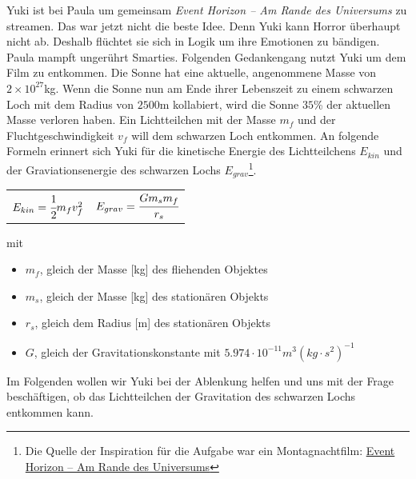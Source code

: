 \documentclass[a4paper, 9pt]{scrartcl}\usepackage[]{graphicx}\usepackage[]{xcolor}
\begin{document}
Yuki ist bei Paula um gemeinsam \textit{Event Horizon -- Am Rande des Universums} zu streamen. Das war jetzt nicht die beste Idee. Denn Yuki kann Horror überhaupt nicht ab. Deshalb flüchtet sie sich in Logik um ihre Emotionen zu bändigen. Paula mampft ungerührt Smarties. Folgenden Gedankengang nutzt Yuki um dem Film zu entkommen. Die Sonne hat eine aktuelle, angenommene Masse von $\ensuremath{2\times 10^{27}}$kg. Wenn die Sonne nun am Ende ihrer Lebenszeit zu einem schwarzen Loch mit dem Radius von $2500$m kollabiert, wird die Sonne $35$\% der aktuellen Masse verloren haben. Ein Lichtteilchen mit der Masse $m_f$ und der Fluchtgeschwindigkeit $v_f$ will dem schwarzen Loch entkommen. An folgende Formeln erinnert sich Yuki für die kinetische Energie des Lichtteilchens $E_{kin}$ und der Graviationsenergie des schwarzen Lochs $E_{grav}$\footnote{Die Quelle der Inspiration für die Aufgabe war ein Montagnachtfilm: \href{https://de.wikipedia.org/wiki/Event_Horizon_–_Am_Rande_des_Universums}{Event Horizon – Am Rande des Universums}}.

\begin{center}
  \begin{tabular}{cc}
    $E_{kin} = \cfrac{1}{2}m_fv_f^2$ & $E_{grav} = \cfrac{Gm_sm_f}{r_s}$\\
  \end{tabular}
\end{center}

mit

\begin{itemize}[noitemsep]
\item $m_f$, gleich der Masse [kg] des fliehenden Objektes
\item $m_s$, gleich der Masse [kg] des stationären Objekts
\item $r_s$, gleich dem Radius [m] des stationären Objekts  
\item $G$, gleich der Gravitationskonstante mit $5.974 \cdot 10^{-11} m^3(kg \cdot s^2)^{-1}$ 
\end{itemize}

Im Folgenden wollen wir Yuki bei der Ablenkung helfen und uns mit der Frage beschäftigen, ob das Lichtteilchen der Gravitation des schwarzen Lochs entkommen kann.
\end{document}

